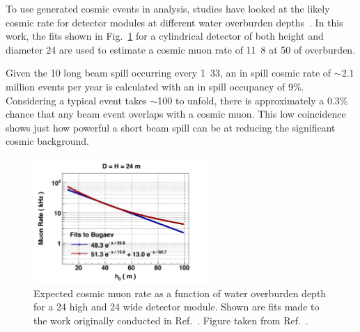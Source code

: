 To use generated cosmic events in analysis, studies have looked at the likely cosmic rate for
\chips detector modules at different water overburden depths~\cite{son2013}. In this work, the
fits shown in Fig.~\ref{fig:cosmic_rate} for a cylindrical detector of both height and diameter
\unit{24}{} are used to estimate a \chipsfive cosmic muon rate of \unit{11.8}{}
at \unit{50}{} of overburden.

Given the \unit{10}{\micro{}} long \numi beam spill occurring every
\unit{1.33}{}, an in spill cosmic rate of $\sim2.1$ million events per year is
calculated with an in spill occupancy of 9\%. Considering a typical event takes
$\sim$\unit{100}{} to unfold, there is approximately a 0.3\% chance that any beam event
overlaps with a cosmic muon. This low coincidence shows just how powerful a short beam spill can
be at reducing the significant cosmic background.

\begin{figure} %
    \includegraphics[width=0.6\textwidth]{diagrams/4-chips/cosmic_rate.pdf}
    \caption[Expected \chipsfive cosmic muon rate as a function of water overburden depth]
    {Expected cosmic muon rate as a function of water overburden depth for a \unit{24}{}
        high and \unit{24}{} wide \chips detector module. Shown are fits made to the work
        originally conducted in Ref.~\cite{bugaev1998}. Figure taken from Ref.~\cite{son2013}.}
    \label{fig:cosmic_rate}
\end{figure}